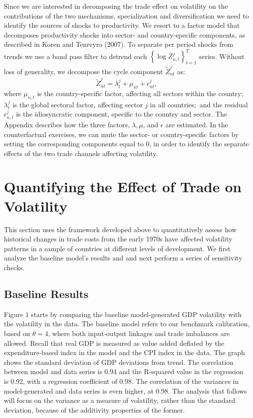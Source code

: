 \documentclass[12pt]{article}
\begin{document}
Since we are interested in decomposing the trade effect on volatility on the
contributions of the two mechanisms, specialization and diversification we
need to identify the sources of shocks to productivity. We resort to a
factor model that decomposes productivity shocks into sector- and
country-specific components, as described in Koren and Tenreyro (2007). To
separate per period shocks from trends we use a band pass filter to detrend
each $\left\{ \log {Z_{n,t}^{j}}\right\} _{t=1}^{T}$ series. 
Without loss of generality, we decompose the cycle component $\tilde{Z}_{nt}^{j}$ as: 
\begin{equation*}
\tilde{Z}_{nt}^{j}=\lambda _{t}^{j}+\mu _{nt}+\epsilon _{nt}^{j},
\end{equation*}%
where ${\mu _{n,t}}$ is the country-specific factor, affecting all sectors
within the country; $\lambda _{t}^{j}$ is the global sectoral factor,
affecting sector $j$ in all countries;\ and the residual $\epsilon
_{n,t}^{j} $ is the idiosyncratic component, specific to the country and
sector. The Appendix describes how the three factors, $\lambda ,\mu $, and $%
\epsilon $ are estimated. In the counterfactual exercises, we can mute the
sector- or country-specific factors by setting the corresponding components
equal to 0, in order to identify the separate effects of the two trade
channels affecting volatility.

\section{Quantifying the Effect of Trade on Volatility}

This section uses the framework developed above to quantitatively assess how
historical changes in trade costs from the early 1970s have affected
volatility patterns in a sample of countries at different levels of
development. We first analyze the baseline model's results and and next
perform a series of sensitivity checks.

\subsection{Baseline Results}

Figure $1$ starts by comparing the baseline model-generated GDP volatility
with the volatility in the data. The baseline model refers to our benchmark
calibration, based on $\theta =4$, where both input-output linkages and
trade imbalances are allowed. Recall that real GDP is measured as value
added deflated by the expenditure-based index in the model and the CPI index
in the data. The graph shows the standard deviation of GDP deviations from
trend. The correlation between model and data series is 0.94 and the
R-squared value in the regression is 0.92, with a regression coefficient of
0.98. The correlation of the variances in model-generated and data series is
even higher, at 0.98. The analysis that follows will focus on the variance
as a measure of volatility, rather than the standard deviation, because of
the additivity properties of the former.
\end{document}
